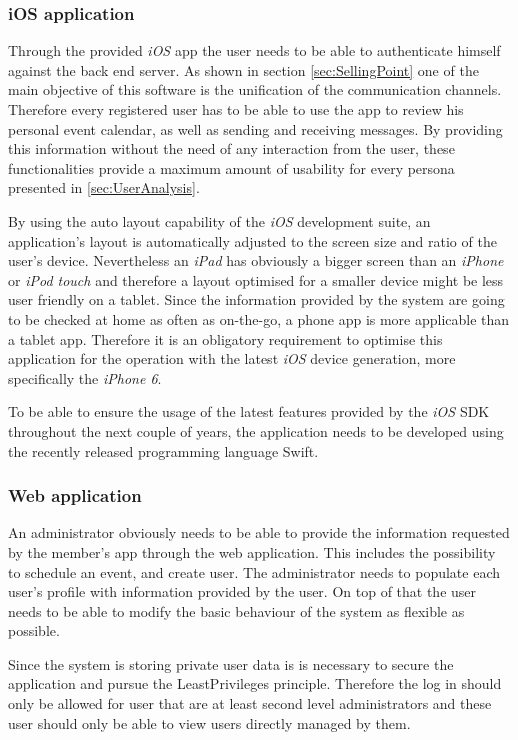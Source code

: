 \subsubsection{iOS application}

Through the provided \emph{iOS} app the user needs to be able to authenticate himself against the back end server. As shown in section \vref{sec:SellingPoint} one of the main objective of this software is the unification of the communication channels. Therefore every registered user has to be able to use the app to review his personal event calendar, as well as sending and receiving messages. By providing this information without the need of any interaction from the user, these functionalities provide a maximum amount of usability for every persona presented in \vref{sec:UserAnalysis}. 

By using the auto layout capability of the \emph{iOS} development suite, an application's layout is automatically adjusted to the screen size and ratio of the user's device. Nevertheless an \emph{iPad} has obviously a bigger screen than an \emph{iPhone} or \emph{iPod touch} and therefore a layout optimised for a smaller device might be less user friendly on a tablet. Since the information provided by the system are going to be checked at home as often as on-the-go, a phone app is more applicable than a tablet app. Therefore it is an obligatory requirement to optimise this application for the operation with the latest \emph{iOS} device generation, more specifically the \emph{iPhone 6}.

To be able to ensure the usage of the latest features provided by the \emph{iOS} \gls{SDK} throughout the next couple of years, the application needs to be developed using the recently released programming language \gls{Swift}.

\subsubsection{Web application}

An administrator obviously needs to be able to provide the information requested by the member's app through the web application. This includes the possibility to schedule an event, and create user. The administrator needs to populate each user's profile with information provided by the user. On top of that the user needs to be able to modify the basic behaviour of the system as flexible as possible.

Since the system is storing private user data is is necessary to secure the application and pursue the \gls{LeastPrivileges} principle. Therefore the log in should only be allowed for user that are at least second level administrators and these user should only be able to view users directly managed by them.

